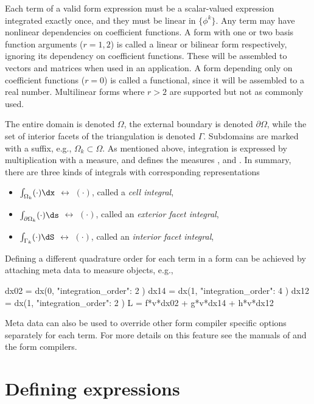 Each term of a valid form expression must be a scalar-valued
expression integrated exactly once, and they must be linear in $\{
\phi^k \}$.  Any term may have nonlinear dependencies on coefficient
functions.  A form with one or two basis function arguments ($r=1,2$)
is called a linear or bilinear form respectively, ignoring its
dependency on coefficient functions. These will be assembled to
vectors and matrices when used in an application.  A form depending
only on coefficient functions ($r=0$) is called a functional, since it
will be assembled to a real number. Multilinear forms where $r > 2$
are supported but not as commonly used.

The entire domain is denoted $\Omega$, the external boundary is
denoted $\partial\Omega$, while the set of interior facets of the
triangulation is denoted $\Gamma$. Subdomains are marked with a
suffix, e.g., $\Omega_k \subset \Omega$. As mentioned above,
integration is expressed by multiplication with a measure, and \ufl{}
defines the measures ,  and .  In
summary, there are three kinds of integrals with corresponding \ufl{}
representations
\begin{itemize}
\item $\int_{        \Omega_k} (\cdot) \dx$ $\leftrightarrow$  $(\cdot)$, called a \emph{cell integral},
\item $\int_{\partial\Omega_k} (\cdot) \ds$ $\leftrightarrow$  $(\cdot)$, called an \emph{exterior facet integral},
\item $\int_{        \Gamma_k} (\cdot) \dS$ $\leftrightarrow$  $(\cdot)$, called an \emph{interior facet integral},
\end{itemize}
Defining a different quadrature order for each term in a form can be
achieved by attaching meta data to measure objects, e.g.,
\begin{python}
dx02 = dx(0, { "integration_order": 2 })
dx14 = dx(1, { "integration_order": 4 })
dx12 = dx(1, { "integration_order": 2 })
L = f*v*dx02 + g*v*dx14 + h*v*dx12
\end{python}
Meta data can also be used to override other form compiler specific
options separately for each term. For more details on this feature see
the manuals of \ufl{} and the form compilers.


\section{Defining expressions}
\label{ufl:sec:defexpr}

